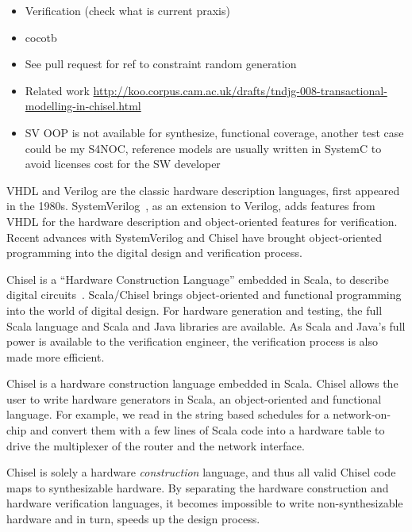 \documentclass[conference]{IEEEtran}
\begin{document}
\begin{itemize}
\item Verification (check what is current praxis)
\item cocotb
\item See pull request for ref to constraint random generation
\item Related work \url{http://koo.corpus.cam.ac.uk/drafts/tndjg-008-transactional-modelling-in-chisel.html}
\item SV OOP is not available for synthesize, functional coverage, another test case could be my S4NOC, reference models are usually written in SystemC to avoid licenses cost for the SW developer
\end{itemize}

VHDL and Verilog are the classic hardware description languages, first appeared in the 1980s.
SystemVerilog~\cite{SystemVerilog}, as an extension to Verilog, adds features from VHDL
for the hardware description and object-oriented features for verification.
Recent advances with SystemVerilog and Chisel \cite{chisel:dac2012, chisel:book} have
brought object-oriented programming into the digital design and verification process.

Chisel is a ``Hardware Construction Language'' embedded in Scala, to describe digital circuits~\cite{chisel:dac2012}.
Scala/Chisel brings object-oriented and functional programming into the world of digital design.
For hardware generation and testing, the full Scala language and Scala and Java libraries are available.
As Scala and Java's full power is available to the verification engineer,
the verification process is also made more efficient.


Chisel is a hardware construction language embedded in Scala.
Chisel allows the user to write hardware generators in Scala, an object-oriented and functional language.
For example, we read in the string based schedules for a network-on-chip
and convert them with a few lines of Scala code into a hardware table to
drive the multiplexer of the router and the network interface.

Chisel is solely a hardware \emph{construction} language, and thus all valid Chisel code
maps to synthesizable hardware.
By separating the hardware construction and hardware verification languages,
it becomes impossible to write non-synthesizable hardware and in turn, speeds up the design process.
\end{document}
